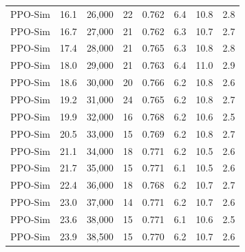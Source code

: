\begin{tabular}{lrrrrrrr}
PPO-Sim & 16.1 & 26,000 & 22 & 0.762 & 6.4 & 10.8 & 2.8 \\
PPO-Sim & 16.7 & 27,000 & 21 & 0.762 & 6.3 & 10.7 & 2.7 \\
PPO-Sim & 17.4 & 28,000 & 21 & 0.765 & 6.3 & 10.8 & 2.8 \\
PPO-Sim & 18.0 & 29,000 & 21 & 0.763 & 6.4 & 11.0 & 2.9 \\
PPO-Sim & 18.6 & 30,000 & 20 & 0.766 & 6.2 & 10.8 & 2.6 \\
PPO-Sim & 19.2 & 31,000 & 24 & 0.765 & 6.2 & 10.8 & 2.7 \\
PPO-Sim & 19.9 & 32,000 & 16 & 0.768 & 6.2 & 10.6 & 2.5 \\
PPO-Sim & 20.5 & 33,000 & 15 & 0.769 & 6.2 & 10.8 & 2.7 \\
PPO-Sim & 21.1 & 34,000 & 18 & 0.771 & 6.2 & 10.5 & 2.6 \\
PPO-Sim & 21.7 & 35,000 & 15 & 0.771 & 6.1 & 10.5 & 2.6 \\
PPO-Sim & 22.4 & 36,000 & 18 & 0.768 & 6.2 & 10.7 & 2.7 \\
PPO-Sim & 23.0 & 37,000 & 14 & 0.771 & 6.2 & 10.7 & 2.6 \\
PPO-Sim & 23.6 & 38,000 & 15 & 0.771 & 6.1 & 10.6 & 2.5 \\
PPO-Sim & 23.9 & 38,500 & 15 & 0.770 & 6.2 & 10.7 & 2.6 \\
\bottomrule\end{tabular}
